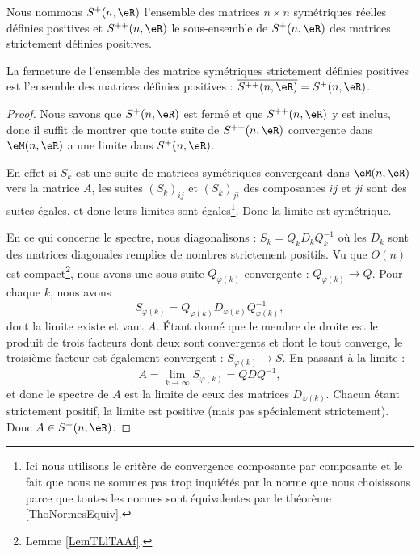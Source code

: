 Nous nommons \( S^+(n,\eR)\) l'ensemble des matrices \( n\times n\) symétriques réelles définies positives et \( S^{++}(n,\eR)\) le sous-ensemble de \( S^+(n,\eR)\) des matrices strictement définies positives.

\begin{lemma}   \label{LemZKJWqIP}
    La fermeture de l'ensemble des matrice symétriques strictement définies positives est l'ensemble des matrices définies positives : \( \overline{ S^{++}(n,\eR) }=S^+(n,\eR)\).
\end{lemma}

\begin{proof}
    Nous savons que \( S^+(n,\eR)\) est fermé et que \( S^{++}(n,\eR)\) y est inclus, donc il suffit de montrer que toute suite de \( S^{++}(n,\eR)\) convergente dans \( \eM(n,\eR)\) a une limite dans \( S^+(n,\eR)\).

    En effet si \( S_k\) est une suite de matrices symétriques convergeant dans \( \eM(n,\eR)\) vers la matrice \( A\), les suites \( (S_k)_{ij}\) et \( (S_k)_{ji}\) des composantes \( ij\) et \( ji\) sont des suites égales, et donc leurs limites sont égales\footnote{Ici nous utilisons le critère de convergence composante par composante et le fait que nous ne sommes pas trop inquiétés par la norme que nous choisissons parce que toutes les normes sont équivalentes par le théorème \ref{ThoNormesEquiv}.}. Donc la limite est symétrique.

    En ce qui concerne le spectre, nous diagonalisons : \( S_k=Q_kD_kQ_k^{-1}\) où les \( D_k\) sont des matrices diagonales remplies de nombres strictement positifs. Vu que \( O(n)\) est compact\footnote{Lemme \ref{LemTLlTAAf}.}, nous avons une sous-suite \( Q_{\varphi(k)}\) convergente : \( Q_{\varphi(k)}\to Q\). Pour chaque \( k\), nous avons
    \begin{equation}
        S_{\varphi(k)}=Q_{\varphi(k)}D_{\varphi(k)}Q^{-1}_{\varphi(k)},
    \end{equation}
    dont la limite existe et vaut \( A\). Étant donné que le membre de droite est le produit de trois facteurs dont deux sont convergents et dont le tout converge, le troisième facteur est également convergent : \( S_{\varphi(k)}\to S\). En passant à la limite :
    \begin{equation}
        A=\lim_{k\to \infty } S_{\varphi(k)}=QDQ^{-1},
    \end{equation}
    et donc le spectre de \( A\) est la limite de ceux des matrices \( D_{\varphi(k)}\). Chacun étant strictement positif, la limite est positive (mais pas spécialement strictement). Donc \( A\in S^+(n,\eR)\).
\end{proof}

